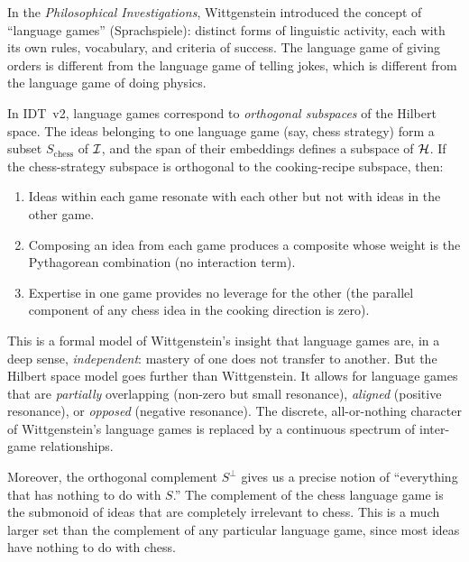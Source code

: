 \begin{interpretation}
\label{interp:language-games}
In the \emph{Philosophical Investigations}, Wittgenstein introduced the concept
of ``language games'' (Sprachspiele): distinct forms of linguistic activity,
each with its own rules, vocabulary, and criteria of success. The language game
of giving orders is different from the language game of telling jokes, which is
different from the language game of doing physics.

In IDT~v2, language games correspond to \emph{orthogonal subspaces} of the
Hilbert space. The ideas belonging to one language game (say, chess strategy)
form a subset $S_{\text{chess}}$ of $\mathcal{I}$, and the span of their embeddings
defines a subspace of $\mathcal{H}$. If the chess-strategy subspace is orthogonal
to the cooking-recipe subspace, then:

\begin{enumerate}
\item Ideas within each game resonate with each other but not with ideas in the
other game.
\item Composing an idea from each game produces a composite whose weight is
the Pythagorean combination (no interaction term).
\item Expertise in one game provides no leverage for the other (the parallel
component of any chess idea in the cooking direction is zero).
\end{enumerate}

This is a formal model of Wittgenstein's insight that language games are, in a
deep sense, \emph{independent}: mastery of one does not transfer to another.
But the Hilbert space model goes further than Wittgenstein. It allows for
language games that are \emph{partially} overlapping (non-zero but small
resonance), \emph{aligned} (positive resonance), or \emph{opposed} (negative
resonance). The discrete, all-or-nothing character of Wittgenstein's language
games is replaced by a continuous spectrum of inter-game relationships.

Moreover, the orthogonal complement $S^\perp$ gives us a precise notion of
``everything that has nothing to do with $S$.'' The complement of the chess
language game is the submonoid of ideas that are completely irrelevant to
chess. This is a much larger set than the complement of any particular
language game, since most ideas have nothing to do with chess.
\end{interpretation}


